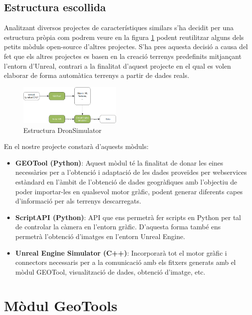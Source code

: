\documentclass[10pt,a4paper,twocolumn,twoside]{article}
\begin{document}
\subsection{Estructura escollida}

Analitzant diversos projectes de característiques similars s'ha decidit per una estructura pròpia com podrem veure en la figura \ref{fig-dronsimulatormodules} podent reutilitzar alguns dels petits mòduls open-source d'altres projectes. S'ha pres aquesta decisió a causa del fet que els altres projectes es basen en la creació terrenys predefinits mitjançant l'entorn d'Unreal, contrari a la finalitat d'aquest projecte en el qual es volen elaborar de forma automàtica terrenys a partir de dades reals.

\begin{figure}[!h]
\centering
  	\includegraphics[width=0.45\textwidth]{structuretfg}
	\caption{Estructura DronSimulator}
	\label{fig-dronsimulatormodules}
\end{figure}

En el nostre projecte constarà d'aquests mòduls:

\begin{itemize}
  \item \textbf{GEOTool (Python)}: Aquest mòdul té la finalitat de donar les eines necessàries per a l'obtenció i adaptació de les dades proveïdes per webservices estàndard en l'àmbit de l'obtenció de dades geogràfiques amb l'objectiu de poder importar-les en qualsevol motor gràfic, podent generar diferents capes d'informació per als terrenys descarregats.
  \item \textbf{ScriptAPI (Python)}: API que ens permetrà fer scripts en Python per tal de controlar la càmera en l'entorn gràfic. D'aquesta forma també ens permetrà l'obtenció d'imatges en l'entorn Unreal Engine.
  \item \textbf{Unreal Engine Simulator (C++)}: Incorporarà tot el motor gràfic i connectors necessaris per a la comunicació amb els fitxers generats amb el mòdul GEOTool, visualització de dades, obtenció d'imatge, etc.
\end{itemize}

\section{Mòdul GeoTools}
\end{document}
